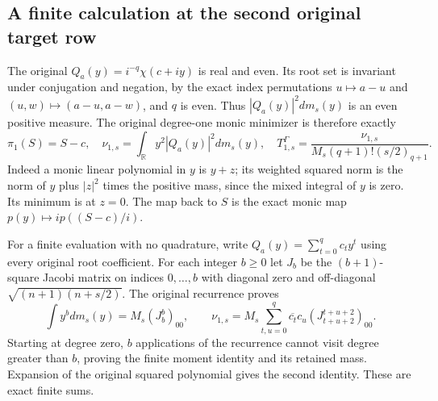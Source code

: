 \documentclass[11pt,a4paper]{article}
\begin{document}
\subsection{A finite calculation at the second original target row}
The original $Q_a(y)=i^{-q}\chi(c+iy)$ is real and even. Its root
set is invariant under conjugation and negation, by the exact
index permutations $u\mapsto a-u$ and
$(u,w)\mapsto(a-u,a-w)$, and $q$ is even. Thus
$|Q_a(y)|^2dm_s(y)$ is an even positive measure.
The original degree-one monic minimizer is therefore exactly
\[
 \pi_1(S)=S-c,\quad
 \nu_{1,s}=\int_{\mathbb R}y^2|Q_a(y)|^2dm_s(y),\quad
 T_{1,s}^\Gamma=\frac{\nu_{1,s}}{M_s(q+1)!(s/2)_{q+1}}.
                                                               \tag{IGI24}
\]
Indeed a monic linear polynomial in $y$ is $y+z$; its weighted
squared norm is the norm of $y$ plus $|z|^2$ times the positive
mass, since the mixed integral of $y$ is zero. Its minimum is
at $z=0$. The map back to $S$ is the exact monic map
$p(y)\mapsto i p((S-c)/i)$.

For a finite evaluation with no quadrature, write
$Q_a(y)=\sum_{t=0}^q c_ty^t$ using every original root coefficient.
For each integer $b\ge0$ let $J_b$ be the $(b+1)$-square Jacobi
matrix on indices $0,\ldots,b$ with diagonal zero and off-diagonal
$\sqrt{(n+1)(n+s/2)}$. The original recurrence proves
\[
 \int y^b dm_s(y)=M_s(J_b^b)_{00},\qquad
 \nu_{1,s}=M_s\sum_{t,u=0}^q
             \overline{c_t}c_u(J_{t+u+2}^{t+u+2})_{00}.
                                                               \tag{IGI25}
\]
Starting at degree zero, $b$ applications of the recurrence cannot
visit degree greater than $b$, proving the finite moment identity
and its retained mass. Expansion of the original squared polynomial
gives the second identity. These are exact finite sums.
\end{document}
